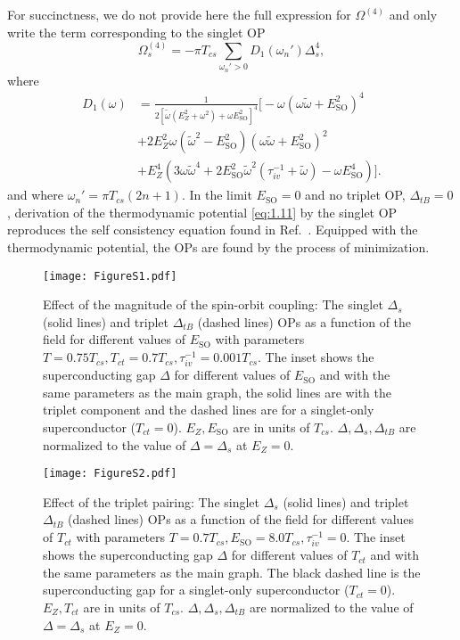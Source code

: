 \documentclass[showpacs,superscriptaddress,onecolumn,prb]{revtex4}
\begin{document}
For succinctness, we do not provide here the full expression for $\Omega^{\left(4\right)}$
and only write the term corresponding to the singlet OP 
\begin{equation}
\Omega_{s}^{\left(4\right)}=-\pi T_{cs}\underset{\omega_{n}'>0}{\sum}D_{1}\left(\omega_{n}'\right)\Delta_s^4,\label{eq:1.17}
\end{equation}
where
\begin{align}
D_{1}\left(\omega\right) & =\frac{1}{2\left[\tilde{\omega}\left(E_Z^{2}+\omega^{2}\right)+\omega E_{\mathrm{SO}}^{2}\right]^{4}}\biggr[-\omega\left(\omega\tilde{\omega}+E_{\mathrm{SO}}^{2}\right)^{4}\label{eq:1.18}\\
 & +2E_Z^{2}\omega\left(\tilde{\omega}^{2}-E_{\mathrm{SO}}^{2}\right)\left(\omega\tilde{\omega}+E_{\mathrm{SO}}^{2}\right)^{2}\nonumber \\
 & +E_Z^{4}\left(3\omega\tilde{\omega}^{4}+2E_{\mathrm{SO}}^{2}\tilde{\omega}^{2}\left(\tau_{iv}^{-1}+\tilde{\omega}\right)-\omega E_{\mathrm{SO}}^{4}\right)\biggr].\nonumber 
\end{align}
and where $\omega_{n}'=\pi T_{cs}\left(2n+1\right)$. In the limit $E_{\mathrm{SO}}=0$ and no triplet OP, $\Delta_{tB}=0$, derivation of the thermodynamic potential \eqref{eq:1.11} by the singlet OP reproduces the self consistency equation found in Ref.~\cite{Maki1964}. Equipped
with the thermodynamic potential, the
OPs are found by the process of minimization. 

\begin{figure}
\texttt{[image: FigureS1.pdf]}
\caption{\label{Fig4} Effect of the magnitude of the spin-orbit coupling: The singlet $\Delta_s$ (solid lines) and triplet $\Delta_{tB}$
(dashed lines) OPs as a function of the field for different values
of $E_{\mathrm{SO}}$ with parameters $T=0.75T_{cs},T_{ct}=0.7T_{cs},\tau_{iv}^{-1}=0.001T_{cs}$.
The inset shows the superconducting gap $\Delta$ for different values
of $E_{\mathrm{SO}}$ and with the same parameters as the main
graph, the solid lines are with the triplet component and the dashed
lines are for a singlet-only superconductor ($T_{ct}=0$). $E_Z,E_{\mathrm{SO}}$
are in units of $T_{cs}$. $\Delta,\Delta_s,\Delta_{tB}$
are normalized to the value of $\Delta=\Delta_s$ at $E_Z=0$.}
\end{figure}

\begin{figure}
\texttt{[image: FigureS2.pdf]}
\caption{\label{Fig5} Effect of the triplet pairing: The singlet $\Delta_s$ (solid lines) and triplet $\Delta_{tB}$
(dashed lines) OPs as a function of the field for different values
of $T_{ct}$ with parameters $T=0.7T_{cs},E_{\mathrm{SO}}=8.0T_{cs},\tau_{iv}^{-1}=0$.
The inset shows the superconducting gap $\Delta$ for different values
of $T_{ct}$ and with the same parameters as the main graph.
The black dashed line is the superconducting gap for a singlet-only superconductor ($T_{ct}=0$). $E_Z,T_{ct}$ are in units of $T_{cs}$.
$\Delta,\Delta_s,\Delta_{tB}$ are normalized
to the value of $\Delta=\Delta_s$ at $E_Z=0$.}
\end{figure}
\end{document}
